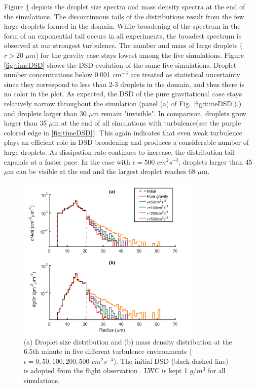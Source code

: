 Figure \ref{fig:DSD} depicts the droplet size spectra and mass density spectra at the end of the simulations. The discontinuous tails of the distributions result from the few large droplets formed in the domain. While broadening of the spectrum in the form of an exponential tail occurs in all experiments, the broadest spectrum is observed at our strongest turbulence. The number and mass of large droplets ($r > 20$ $\mu m$) for the gravity case stays lowest among the five simulations. Figure \ref{fig:timeDSD} shows the DSD evolution of the same five simulations. Droplet number concentrations below 0.001 $cm^{-3}$ are treated as statistical uncertainty since they correspond to less than 2-3 droplets in the domain, and thus there is no color in the plot. As expected, the DSD of the pure gravitational case stays relatively narrow throughout the simulation (panel (a) of Fig. \ref{fig:timeDSD}).) and droplets larger than 30 $\mu$m remain "invisible". In comparison, droplets grow larger than 35 $\mu$m at the end of all simulations with turbulence(see the purple colored edge in \ref{fig:timeDSD}). This again indicates that even weak turbulence plays an efficient role in DSD broadening and produces a considerable number of large droplets. As dissipation rate continues to increase, the distribution tail expands at a faster pace. In the case with $\epsilon=500$ $cm^2s^{-3}$, droplets larger than 45 $\mu$m can be visible at the end and the largest droplet reaches 68 $\mu$m. 

\begin{figure}[ht]
\centering
\includegraphics[width=0.8\textwidth]{Figures/Chap3/DSD.png}
\caption{(a) Droplet size distribution and (b) mass density distribution at the 6.5th minute in five different turbulence environments ($\epsilon=0, 50, 100, 200, 500$ $cm^2 s^{-3}$). The initial DSD (black dashed line) is adopted from the flight observation \citet{Raga1990}. LWC is kept 1 $g/m^3$ for all simulations.} \label{fig:DSD}
\end{figure}


